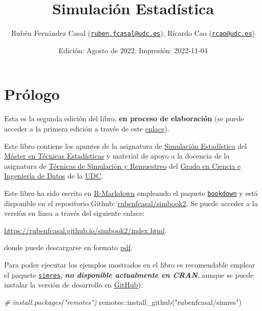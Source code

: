 \documentclass[
]{book}
\title{Simulación Estadística}
\author{Rubén Fernández Casal (\href{mailto:ruben.fcasal@udc.es}{\nolinkurl{ruben.fcasal@udc.es}}), Ricardo Cao (\href{mailto:rcao@udc.es}{\nolinkurl{rcao@udc.es}})}
\date{Edición: Agosto de 2022. Impresión: 2022-11-04}
\newenvironment{Shaded}{\begin{snugshade}}{\end{snugshade}}
\newcommand{\CommentTok}[1]{\textcolor[rgb]{0.56,0.35,0.01}{\textit{#1}}}
\newcommand{\FunctionTok}[1]{\textcolor[rgb]{0.00,0.00,0.00}{#1}}
\newcommand{\NormalTok}[1]{#1}
\newcommand{\SpecialCharTok}[1]{\textcolor[rgb]{0.00,0.00,0.00}{#1}}
\newcommand{\StringTok}[1]{\textcolor[rgb]{0.31,0.60,0.02}{#1}}
\theoremstyle{break}
\theoremstyle{nonumberplain}
\begin{document}
\maketitle

{
\setcounter{tocdepth}{1}
\tableofcontents
}
\hypertarget{pruxf3logo}{%
\chapter*{Prólogo}\label{pruxf3logo}}

Esta es la segunda edición del libro, \textbf{en proceso de elaboración} (se puede acceder a la primera edición a través de este \href{https://rubenfcasal.github.io/simbook/index.html}{enlace}).

Este libro contiene los apuntes de la asignatura de \href{http://eamo.usc.es/pub/mte/index.php/es/?option=com_content\&view=article\&id=2201\&idm=13\&a\%C3\%B1o=2019}{Simulación Estadística} del \href{http://eio.usc.es/pub/mte}{Máster en Técnicas Estadísticas} y material de apoyo a la docencia de la asignatura de \href{https://guiadocente.udc.es/guia_docent/index.php?centre=614\&ensenyament=614G02\&assignatura=614G02036\&idioma=cast}{Técnicas de Simulación y Remuestreo} del \href{https://estudos.udc.es/es/study/start/614G02V01}{Grado en Ciencia e Ingeniería de Datos} de la \href{https://www.udc.es}{UDC}.

Este libro ha sido escrito en \href{http://rmarkdown.rstudio.com}{R-Markdown} empleando el paquete \href{https://bookdown.org/yihui/bookdown/}{\texttt{bookdown}} y está disponible en el repositorio Github: \href{https://github.com/rubenfcasal/simbook2}{rubenfcasal/simbook2}.
Se puede acceder a la versión en línea a través del siguiente enlace:

\url{https://rubenfcasal.github.io/simbook2/index.html}.

donde puede descargarse en formato \href{https://rubenfcasal.github.io/simbook2/Simulacion.pdf}{pdf}.

Para poder ejecutar los ejemplos mostrados en el libro es recomendable emplear el paquete \href{https://rubenfcasal.github.io/simres}{\texttt{simres}}, \textbf{\emph{no disponible actualmente en CRAN}}, aunque se puede instalar la versión de desarrollo en \href{https://github.com/rubenfcasal/simres}{GitHub}):

\begin{Shaded}
\begin{Highlighting}[]
\CommentTok{\# install.packages("remotes")}
\NormalTok{remotes}\SpecialCharTok{::}\FunctionTok{install\_github}\NormalTok{(}\StringTok{"rubenfcasal/simres"}\NormalTok{)}
\end{Highlighting}
\end{Shaded}
\end{document}
